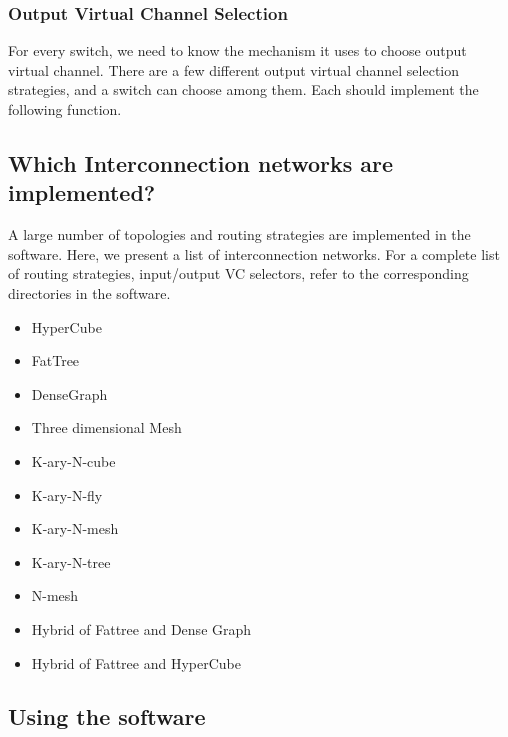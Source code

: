 

\subsubsection{Output Virtual Channel Selection}
For every switch, we need to know the mechanism it uses to choose output virtual channel.
There are a few different output virtual channel selection strategies, and a switch
can choose among them. Each should implement the following function.



\subsection{Which Interconnection networks are implemented?}
A large number of topologies and routing strategies are implemented in the
software. Here, we present a list of interconnection networks. For a complete
list of routing strategies, input/output VC selectors, refer to the
corresponding directories in the software.

\begin{itemize}
\item HyperCube
\item FatTree
\item DenseGraph
\item Three dimensional Mesh
\item K-ary-N-cube
\item K-ary-N-fly
\item K-ary-N-mesh
\item K-ary-N-tree
\item N-mesh
\item Hybrid of Fattree and Dense Graph
\item Hybrid of Fattree and HyperCube
\end{itemize}


\subsection{Using the software}

